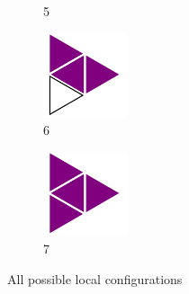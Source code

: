 \documentclass{article}
\begin{document}
\begin{figure}[H]
\begin{subfigure}[b]{0.1\textwidth}
         \caption*{5}
     \end{subfigure}
     \hfill
     \begin{subfigure}[b]{0.1\textwidth}
         \centering
         \includegraphics[width=\textwidth]{graphics/introduction/configurations/c6.pdf}
         \caption*{6}
     \end{subfigure}
     \hfill
     \begin{subfigure}[b]{0.1\textwidth}
         \centering
         \includegraphics[width=\textwidth]{graphics/introduction/configurations/c7.pdf}
         \caption*{7}
     \end{subfigure}
     \hfill
     \caption{All possible local configurations}
        \label{fig:configurations}
\end{figure}
\end{document}
